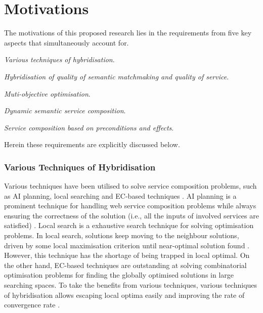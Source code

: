 \section{Motivations}\label{C:motivation}
The motivations of this proposed research lies in the requirements from five key aspects that simultaneously account for. 
\begin{enumerate*}
 \item \emph{Various techniques of hybridisation}.
 \item \emph{Hybridisation of quality of semantic matchmaking and quality of service}.
 \item \emph{Muti-objective optimisation}.
 \item \emph{Dynamic semantic service composition}.
 \item \emph{Service composition based on preconditions and effects}.
\end{enumerate*}
Herein these requirements are explicitly discussed below. 
\subsubsection{Various Techniques of Hybridisation}

Various techniques have been utilised to solve service composition problems, such as AI planning, local searching and EC-based techniques \cite{feng2013dynamic,parejo2008qos,qi2010combining,wang2014automated}. AI planning is a prominent technique for handling web service composition problems while always ensuring the correctness of the solution (i.e., all the inputs of involved services are satisfied) \cite{wang2014automated}.  Local search is a exhaustive search technique for solving optimisation problems. In local search, solutions keep moving to the neighbour solutions, driven by some local maximisation criterion until near-optimal solution found \cite{parejo2008qos}. However, this technique has the shortage of being trapped in local optimal. On the other hand, EC-based techniques are outstanding at solving combinatorial optimisation problems for finding the globally optimised solutions in large searching spaces. To take the benefits from various techniques,  various techniques of hybridisation allows escaping local optima easily and improving the rate of convergence rate \cite{renders1996hybrid}.

